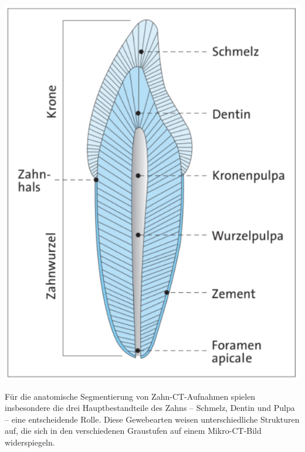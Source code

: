\begin{minipage}{0.50\textwidth}
	\centering
	\includegraphics[scale=0.50]{img/aufbau_eines_zahns.jpg}
	\label{fig:aufbau_eines_zahnes}
\end{minipage}

Für die anatomische Segmentierung von Zahn-\ac{CT}-Aufnahmen spielen insbesondere
die drei Hauptbestandteile des Zahns – Schmelz, Dentin und Pulpa – eine
entscheidende Rolle. Diese Gewebearten weisen unterschiedliche Strukturen auf,
die sich in den verschiedenen Graustufen auf einem Mikro-\ac{CT}-Bild widerspiegeln.

